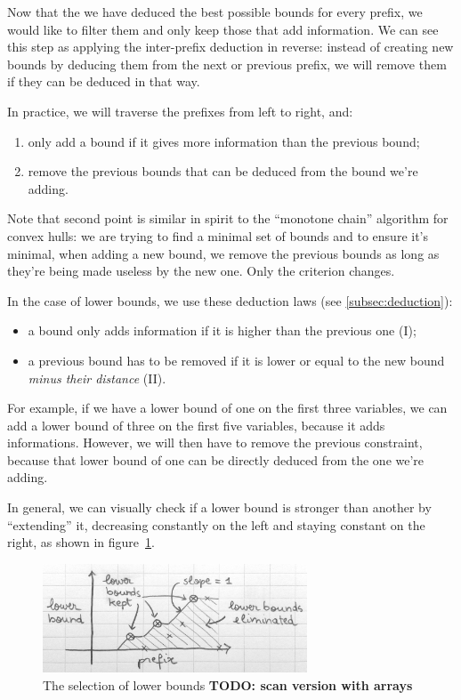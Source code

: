 \documentclass[a4paper,10pt]{article}
\begin{document}
Now that the we have deduced the best possible bounds for every prefix, we would like to filter them and only keep those that add information. We can see this step as applying the inter-prefix deduction in reverse: instead of creating new bounds by deducing them from the next or previous prefix, we will remove them if they can be deduced in that way.

In practice, we will traverse the prefixes from left to right, and:
\begin{enumerate}
    \item only add a bound if it gives more information than the previous bound;
    \item remove the previous bounds that can be deduced from the bound we're adding.
\end{enumerate}

Note that second point is similar in spirit to the ``monotone chain'' algorithm for convex hulls: we are trying to find a minimal set of bounds and to ensure it's minimal, when adding a new bound, we remove the previous bounds as long as they're being made useless by the new one. Only the criterion changes.

In the case of lower bounds, we use these deduction laws (see \ref{subsec:deduction}):
\begin{itemize}
    \item a bound only adds information if it is higher than the previous one (I);
    \item a previous bound has to be removed if it is lower or equal to the new bound \emph{minus their distance} (II).
\end{itemize}

For example, if we have a lower bound of one on the first three variables, we can add a lower bound of three on the first five variables, because it adds informations. However, we will then have to remove the previous constraint, because that lower bound of one can be directly deduced from the one we're adding.

In general, we can visually check if a lower bound is stronger than another by ``extending'' it, decreasing constantly on the left and staying constant on the right, as shown in figure~\ref{fig:lower-bounds}.

\begin{figure}[h!]
    \centering
    \includegraphics[width=0.7\textwidth]{img/lower-bounds}
    \caption{The selection of lower bounds \textbf{TODO: scan version with arrays}}
    \label{fig:lower-bounds}
\end{figure}
\end{document}
